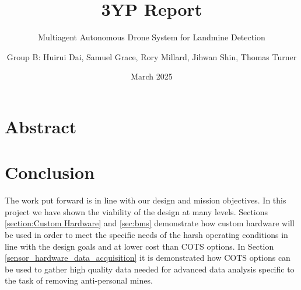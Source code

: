 \documentclass{report_template_oxford}
\title{3YP Report}
\subtitle{Multiagent Autonomous Drone System for Landmine Detection}
\author{Group B: Huirui Dai, Samuel Grace, Rory Millard, Jihwan Shin, Thomas Turner}
\date{March 2025}
\begin{document}
\maketitle




\newpage
{}
\section*{Abstract}


\newpage
\fancyhead[C]{}
\tableofcontents

\newpage
{}
\listoffigures

\newpage
{}
\listoftables

\newpage
{}
\printglossaries

\newpage
{}


























\section{Conclusion} \label{conclusion}
The work put forward is in line with our design and mission objectives. In this project we have shown the viability of the design at many levels. Sections \ref{section:Custom Hardware} and \ref{sec:bms} demonstrate how custom hardware will be used in order to meet the specific needs of the harsh operating conditions in line with the design goals and at lower cost than \gls{COTS} options. In Section \ref{sensor_hardware_data_acquisition} it is demonstrated how \gls{COTS} options can be used to gather high quality data needed for advanced data analysis specific to the task of removing anti-personal mines.
\end{document}

